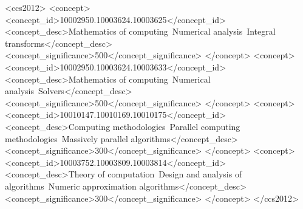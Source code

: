 \documentclass[manuscript,review]{acmart}
\begin{document}
\begin{abstract}
We report (i)~an eight-backend $\times$ device wall-clock
benchmark on a single workstation with a consumer GPU spanning
$8$--$153\times$ speedup over 3D Yee FDTD~\cite{yee1966} for the telegrapher
class (high end attained by PyTorch CPU, GPU rows
$27$--$121\times$) and $12$--$394\times$ over an explicit-time
FTCS+L1 baseline for fractional Caputo (high end attained by CuPy
GPU, remaining GPU rows $19$--$300\times$); per-row data in
\texttt{data/benchmark\_multi\_backend.csv}. (ii)~a
transform-domain head-to-head showing the batched FFT-NILT is
$\sim 5\times$ faster than an optimized de Hoog inversion and
$\sim 13\times$ faster than fixed Talbot at matched accuracy for the
dense-grid, many-mode workload, confirming the advantage reflects
FFT amortization across modes rather than mere comparison against
explicit time marching; and (iii)~an mpmath 50-digit Talbot
ground-truth reference confirming float64 accuracy to $8 \times 10^{-4}$
relative error at the validation depth. The complete source, raw
benchmark data (CSV), reproducibility scripts, and a regression test
suite spanning all four backends and four physics domains are
deposited at
\href{https://doi.org/10.5281/zenodo.20682437}{doi:10.5281/zenodo.20682437}
under the Apache-2.0 license. We request consideration for ACM
\emph{Artifact Available} badging.
\end{abstract}

\begin{CCSXML}
<ccs2012>
   <concept>
       <concept_id>10002950.10003624.10003625</concept_id>
       <concept_desc>Mathematics of computing~Numerical analysis~Integral transforms</concept_desc>
       <concept_significance>500</concept_significance>
       </concept>
   <concept>
       <concept_id>10002950.10003624.10003633</concept_id>
       <concept_desc>Mathematics of computing~Numerical analysis~Solvers</concept_desc>
       <concept_significance>500</concept_significance>
       </concept>
   <concept>
       <concept_id>10010147.10010169.10010175</concept_id>
       <concept_desc>Computing methodologies~Parallel computing methodologies~Massively parallel algorithms</concept_desc>
       <concept_significance>300</concept_significance>
       </concept>
   <concept>
       <concept_id>10003752.10003809.10003814</concept_id>
       <concept_desc>Theory of computation~Design and analysis of algorithms~Numeric approximation algorithms</concept_desc>
       <concept_significance>300</concept_significance>
       </concept>
</ccs2012>
\end{CCSXML}
\end{document}
